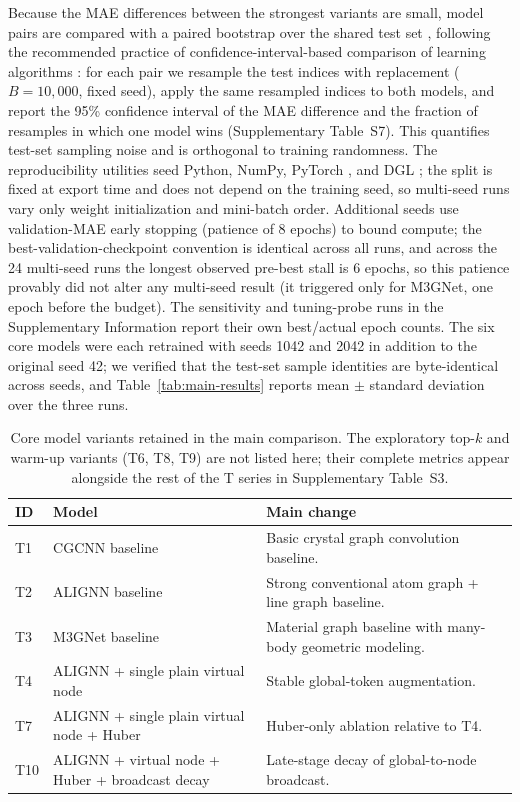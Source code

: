 \documentclass[a4paper,11pt]{article}
\begin{document}
Because the MAE differences between the strongest variants are small, model pairs are compared with a paired bootstrap over the shared test set \cite{efron1979bootstrap,efron1993introduction}, following the recommended practice of confidence-interval-based comparison of learning algorithms \cite{demsar2006statistical}: for each pair we resample the test indices with replacement (\(B=10{,}000\), fixed seed), apply the same resampled indices to both models, and report the 95\% confidence interval of the MAE difference and the fraction of resamples in which one model wins (Supplementary Table~S7). This quantifies test-set sampling noise and is orthogonal to training randomness. The reproducibility utilities seed Python, NumPy, PyTorch \cite{paszke2019pytorch}, and DGL \cite{wang2019dgl}; the split is fixed at export time and does not depend on the training seed, so multi-seed runs vary only weight initialization and mini-batch order. Additional seeds use validation-MAE early stopping (patience of 8 epochs) to bound compute; the best-validation-checkpoint convention is identical across all runs, and across the 24 multi-seed runs the longest observed pre-best stall is 6 epochs, so this patience provably did not alter any multi-seed result (it triggered only for M3GNet, one epoch before the budget). The sensitivity and tuning-probe runs in the Supplementary Information report their own best/actual epoch counts. The six core models were each retrained with seeds 1042 and 2042 in addition to the original seed 42; we verified that the test-set sample identities are byte-identical across seeds, and Table~\ref{tab:main-results} reports mean \(\pm\) standard deviation over the three runs.

\begin{table}[htbp]
\centering
\caption{Core model variants retained in the main comparison. The exploratory top-\(k\) and warm-up variants (T6, T8, T9) are not listed here; their complete metrics appear alongside the rest of the T series in Supplementary Table~S3.}
\label{tab:model-variants}
\small
\begin{tabularx}{\textwidth}{p{1.2cm} p{4.8cm} Y}
\toprule
ID & Model & Main change \\
\midrule
T1 & CGCNN baseline & Basic crystal graph convolution baseline. \\
T2 & ALIGNN baseline & Strong conventional atom graph + line graph baseline. \\
T3 & M3GNet baseline & Material graph baseline with many-body geometric modeling. \\
T4 & ALIGNN + single plain virtual node & Stable global-token augmentation. \\
T7 & ALIGNN + single plain virtual node + Huber & Huber-only ablation relative to T4. \\
T10 & ALIGNN + virtual node + Huber + broadcast decay & Late-stage decay of global-to-node broadcast. \\
\bottomrule
\end{tabularx}
\end{table}
\end{document}
